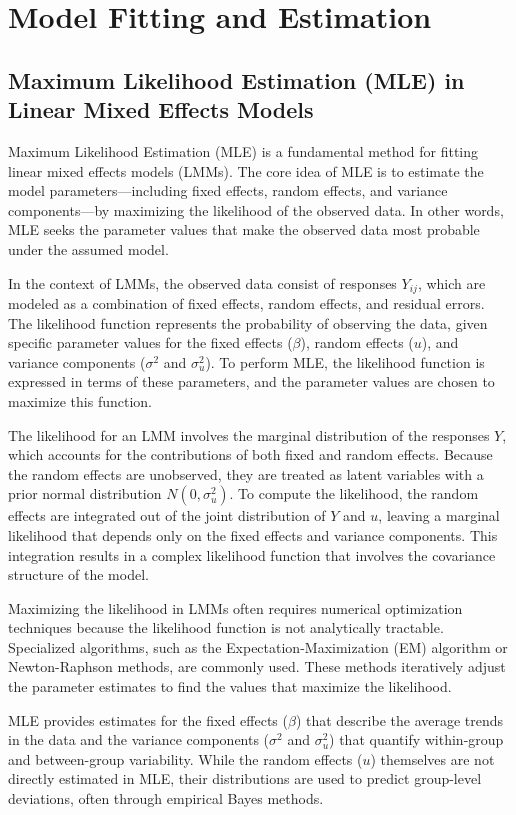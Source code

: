\section{Model Fitting and Estimation}
\subsection{Maximum Likelihood Estimation (MLE) in Linear Mixed Effects Models}
Maximum Likelihood Estimation (MLE) is a fundamental method for fitting linear mixed effects models (LMMs). The core idea of MLE is to estimate the model parameters—including fixed effects, random effects, and variance components—by maximizing the likelihood of the observed data. In other words, MLE seeks the parameter values that make the observed data most probable under the assumed model.

In the context of LMMs, the observed data consist of responses $Y_{ij}$, which are modeled as a combination of fixed effects, random effects, and residual errors. The likelihood function represents the probability of observing the data, given specific parameter values for the fixed effects ($\beta$), random effects ($u$), and variance components ($\sigma^2$ and $\sigma_u^2$). To perform MLE, the likelihood function is expressed in terms of these parameters, and the parameter values are chosen to maximize this function.

The likelihood for an LMM involves the marginal distribution of the responses $Y$, which accounts for the contributions of both fixed and random effects. Because the random effects are unobserved, they are treated as latent variables with a prior normal distribution $N(0,\sigma_u^2)$. To compute the likelihood, the random effects are integrated out of the joint distribution of $Y$ and $u$, leaving a marginal likelihood that depends only on the fixed effects and variance components. This integration results in a complex likelihood function that involves the covariance structure of the model.

Maximizing the likelihood in LMMs often requires numerical optimization techniques because the likelihood function is not analytically tractable. Specialized algorithms, such as the Expectation-Maximization (EM) algorithm or Newton-Raphson methods, are commonly used. These methods iteratively adjust the parameter estimates to find the values that maximize the likelihood.

MLE provides estimates for the fixed effects ($\beta$) that describe the average trends in the data and the variance components ($\sigma^2$ and $\sigma_u^2$) that quantify within-group and between-group variability. While the random effects ($u$) themselves are not directly estimated in MLE, their distributions are used to predict group-level deviations, often through empirical Bayes methods.

